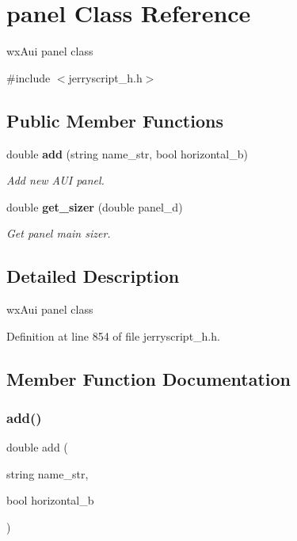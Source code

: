 \section{panel Class Reference}
\label{classpanel}


wx\+Aui panel class  




{\ttfamily \#include $<$jerryscript\+\_\+h.\+h$>$}

\subsection*{Public Member Functions}
\begin{DoxyCompactItemize}
\item 
double \textbf{ add} (string name\+\_\+str, bool horizontal\+\_\+b)
\begin{DoxyCompactList}\small\item\em Add new A\+UI panel. \end{DoxyCompactList}\item 
double \textbf{ get\+\_\+sizer} (double panel\+\_\+d)
\begin{DoxyCompactList}\small\item\em Get panel main sizer. \end{DoxyCompactList}\end{DoxyCompactItemize}


\subsection{Detailed Description}
wx\+Aui panel class 

Definition at line 854 of file jerryscript\+\_\+h.\+h.



\subsection{Member Function Documentation}
\mbox{\label{classpanel_a79fc398bf48fc29226a5d64371047def}} 
\subsubsection{add()}
{\footnotesize\ttfamily double add (\begin{DoxyParamCaption}\item[{string}]{name\+\_\+str,  }\item[{bool}]{horizontal\+\_\+b }\end{DoxyParamCaption})}



